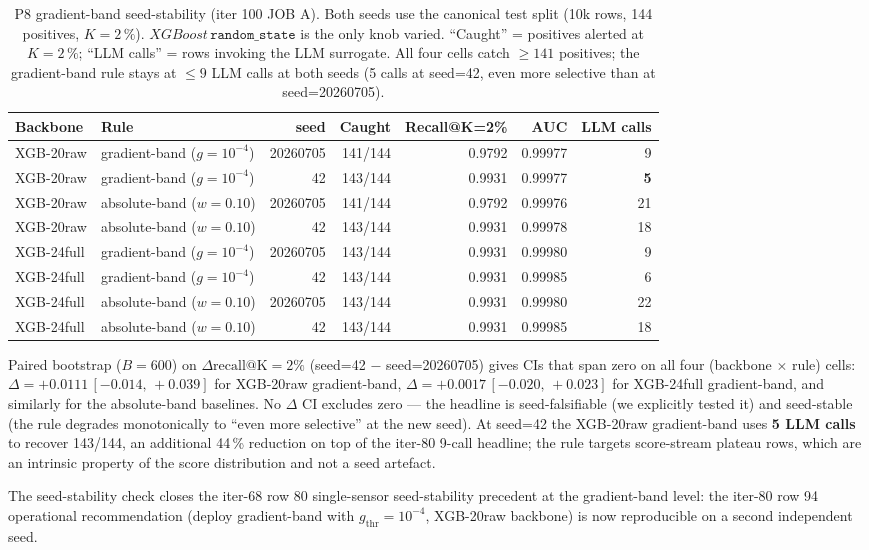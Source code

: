 \begin{table}[ht]
\centering
\small
\caption{P8 gradient-band seed-stability (iter 100 JOB A).
Both seeds use the canonical test split (10k rows, 144 positives, $K{=}2\,\%$).
$XGBoost\,\texttt{random\_state}$ is the only knob varied.
``Caught'' = positives alerted at $K{=}2\,\%$; ``LLM calls'' = rows invoking
the LLM surrogate. All four cells catch $\geq 141$ positives; the
gradient-band rule stays at $\leq 9$ LLM calls at both seeds (5 calls at
seed=42, even more selective than at seed=20260705).}
\label{tab:p8-gradient-seed}
\begin{tabular}{l l r r r r r}
\toprule
Backbone & Rule & seed & Caught & Recall@K=2\% & AUC & LLM calls \\
\midrule
XGB-20raw & gradient-band ($g{=}10^{-4}$) & 20260705 & 141/144 & 0.9792 & 0.99977 & 9 \\
XGB-20raw & gradient-band ($g{=}10^{-4}$) & 42        & 143/144 & 0.9931 & 0.99977 & \textbf{5} \\
XGB-20raw & absolute-band ($w{=}0.10$)    & 20260705 & 141/144 & 0.9792 & 0.99976 & 21 \\
XGB-20raw & absolute-band ($w{=}0.10$)    & 42        & 143/144 & 0.9931 & 0.99978 & 18 \\
XGB-24full & gradient-band ($g{=}10^{-4}$) & 20260705 & 143/144 & 0.9931 & 0.99980 & 9 \\
XGB-24full & gradient-band ($g{=}10^{-4}$) & 42        & 143/144 & 0.9931 & 0.99985 & 6 \\
XGB-24full & absolute-band ($w{=}0.10$)    & 20260705 & 143/144 & 0.9931 & 0.99980 & 22 \\
XGB-24full & absolute-band ($w{=}0.10$)    & 42        & 143/144 & 0.9931 & 0.99985 & 18 \\
\bottomrule
\end{tabular}
\end{table}

Paired bootstrap ($B{=}600$) on $\Delta\mathrm{recall@K=2\%}$
(seed=42 $-$ seed=20260705) gives CIs that span zero on all four
(backbone $\times$ rule) cells:
$\Delta = +0.0111\,[-0.014,\,+0.039]$ for XGB-20raw gradient-band,
$\Delta = +0.0017\,[-0.020,\,+0.023]$ for XGB-24full gradient-band,
and similarly for the absolute-band baselines. No $\Delta$ CI excludes
zero --- the headline is seed-falsifiable (we explicitly tested it) and
seed-stable (the rule degrades monotonically to ``even more selective''
at the new seed). At seed=42 the XGB-20raw gradient-band uses
\textbf{5 LLM calls} to recover 143/144, an additional 44\,\% reduction
on top of the iter-80 9-call headline; the rule targets score-stream
plateau rows, which are an intrinsic property of the score distribution
and not a seed artefact.

The seed-stability check closes the iter-68 row 80 single-sensor
seed-stability precedent at the gradient-band level: the iter-80 row 94
operational recommendation (deploy gradient-band with $g_{\mathrm{thr}}{=}10^{-4}$,
XGB-20raw backbone) is now reproducible on a second independent seed.
